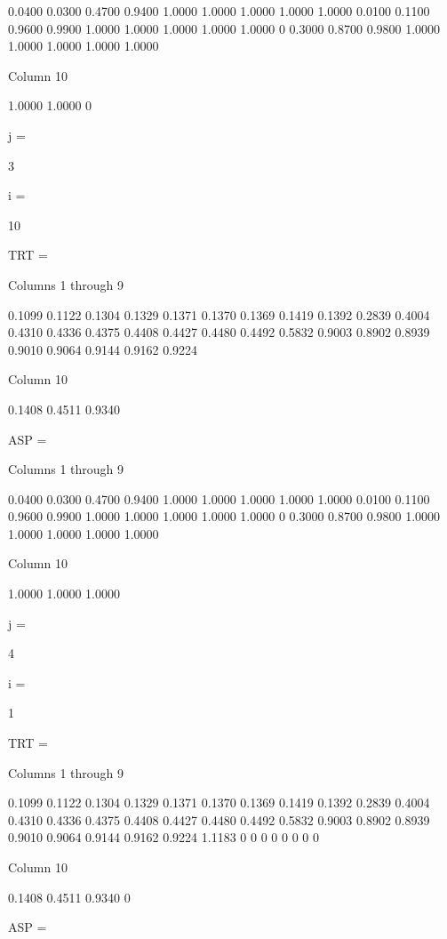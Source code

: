     0.0400    0.0300    0.4700    0.9400    1.0000    1.0000    1.0000    1.0000    1.0000
    0.0100    0.1100    0.9600    0.9900    1.0000    1.0000    1.0000    1.0000    1.0000
         0    0.3000    0.8700    0.9800    1.0000    1.0000    1.0000    1.0000    1.0000

  Column 10

    1.0000
    1.0000
         0


j =

     3


i =

    10


TRT =

  Columns 1 through 9

    0.1099    0.1122    0.1304    0.1329    0.1371    0.1370    0.1369    0.1419    0.1392
    0.2839    0.4004    0.4310    0.4336    0.4375    0.4408    0.4427    0.4480    0.4492
    0.5832    0.9003    0.8902    0.8939    0.9010    0.9064    0.9144    0.9162    0.9224

  Column 10

    0.1408
    0.4511
    0.9340


ASP =

  Columns 1 through 9

    0.0400    0.0300    0.4700    0.9400    1.0000    1.0000    1.0000    1.0000    1.0000
    0.0100    0.1100    0.9600    0.9900    1.0000    1.0000    1.0000    1.0000    1.0000
         0    0.3000    0.8700    0.9800    1.0000    1.0000    1.0000    1.0000    1.0000

  Column 10

    1.0000
    1.0000
    1.0000


j =

     4


i =

     1


TRT =

  Columns 1 through 9

    0.1099    0.1122    0.1304    0.1329    0.1371    0.1370    0.1369    0.1419    0.1392
    0.2839    0.4004    0.4310    0.4336    0.4375    0.4408    0.4427    0.4480    0.4492
    0.5832    0.9003    0.8902    0.8939    0.9010    0.9064    0.9144    0.9162    0.9224
    1.1183         0         0         0         0         0         0         0         0

  Column 10

    0.1408
    0.4511
    0.9340
         0


ASP =

